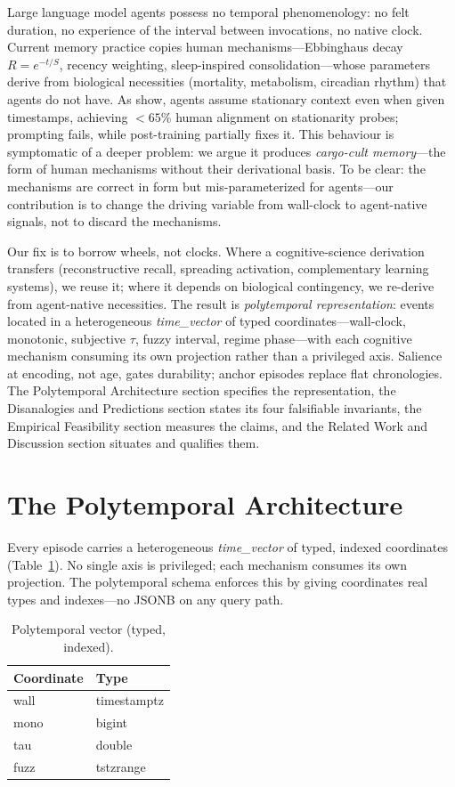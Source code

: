 \documentclass[letterpaper]{article}
\begin{document}
Large language model agents possess no temporal phenomenology: no felt duration, no experience of the interval between invocations, no native clock. Current memory practice copies human mechanisms---Ebbinghaus decay $R=e^{-t/S}$, recency weighting, sleep-inspired consolidation---whose parameters derive from biological necessities (mortality, metabolism, circadian rhythm) that agents do not have. As \citet{cheng2026blind} show, agents assume stationary context even when given timestamps, achieving $<65\%$ human alignment on stationarity probes; prompting fails, while post-training partially fixes it. This behaviour is symptomatic of a deeper problem: we argue it produces \emph{cargo-cult memory}---the form of human mechanisms without their derivational basis. To be clear: the mechanisms are correct in form but mis-parameterized for agents---our contribution is to change the driving variable from wall-clock to agent-native signals, not to discard the mechanisms.

Our fix is to borrow wheels, not clocks. Where a cognitive-science derivation transfers (reconstructive recall, spreading activation, complementary learning systems), we reuse it; where it depends on biological contingency, we re-derive from agent-native necessities. The result is \emph{polytemporal representation}: events located in a heterogeneous \emph{time\_vector} of typed coordinates---wall-clock, monotonic, subjective $\tau$, fuzzy interval, regime phase---with each cognitive mechanism consuming its own projection rather than a privileged axis. Salience at encoding, not age, gates durability; anchor episodes replace flat chronologies. The Polytemporal Architecture section specifies the representation, the Disanalogies and Predictions section states its four falsifiable invariants, the Empirical Feasibility section measures the claims, and the Related Work and Discussion section situates and qualifies them.

\section{The Polytemporal Architecture}\label{sec:arch}
Every episode carries a heterogeneous \emph{time\_vector} of typed, indexed coordinates (Table~\ref{tab:polytemporal}). No single axis is privileged; each mechanism consumes its own projection. The polytemporal schema enforces this by giving coordinates real types and indexes---no JSONB on any query path.

\begin{table}[t]\centering\begin{tabular}{ll}\toprule Coordinate & Type \\ \midrule wall & timestamptz \\ mono & bigint \\ tau & double \\ fuzz & tstzrange \\ \bottomrule\end{tabular}\caption{Polytemporal vector (typed, indexed).}\label{tab:polytemporal}\end{table}
\end{document}
